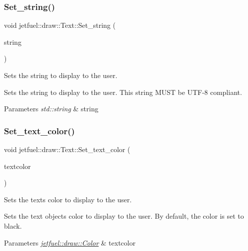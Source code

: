 \subsubsection{\texorpdfstring{Set\+\_\+string()}{Set\_string()}}
{\footnotesize\ttfamily void jetfuel\+::draw\+::\+Text\+::\+Set\+\_\+string (\begin{DoxyParamCaption}\item[{const std\+::string}]{string }\end{DoxyParamCaption})\hspace{0.3cm}{\ttfamily [inline]}}



Sets the string to display to the user. 

Sets the string to display to the user. This string M\+U\+ST be U\+T\+F-\/8 compliant.


\begin{DoxyParams}{Parameters}
{\em std\+::string} & string \\
\hline
\end{DoxyParams}
\mbox{\label{classjetfuel_1_1draw_1_1Text_a7d04c15abedfeb98a1154d7e34d4d630}} 
\subsubsection{\texorpdfstring{Set\+\_\+text\+\_\+color()}{Set\_text\_color()}}
{\footnotesize\ttfamily void jetfuel\+::draw\+::\+Text\+::\+Set\+\_\+text\+\_\+color (\begin{DoxyParamCaption}\item[{const \hyperlink{classjetfuel_1_1draw_1_1Color}{Color}}]{textcolor }\end{DoxyParamCaption})\hspace{0.3cm}{\ttfamily [inline]}}



Sets the text\textquotesingle{}s color to display to the user. 

Sets the text object\textquotesingle{}s color to display to the user. By default, the color is set to black.


\begin{DoxyParams}{Parameters}
{\em \hyperlink{classjetfuel_1_1draw_1_1Color}{jetfuel\+::draw\+::\+Color}} & textcolor \\
\hline
\end{DoxyParams}
\mbox{\label{classjetfuel_1_1draw_1_1Text_a49fbf3401fb8467bcc52345909e4bd27}} 
